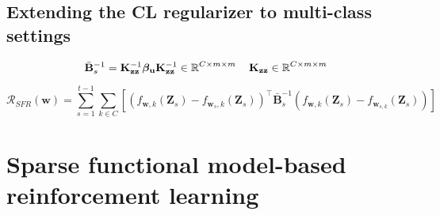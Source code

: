 \documentclass{article}
\newcommand{\mathbold}[1]{\bm{#1}}
\newcommand{\mbf}[1]{\mathbf{#1}}
\newcommand{\MB}{\mbf{B}}
\newcommand{\MZ}{\mbf{Z}}
\newcommand{\T}{\top}
\newcommand{\vbeta}[0]{\mathbold{\beta}}
\newcommand{\vu}{\mbf{u}}
\newcommand{\vw}{\mbf{w}}
\newcommand{\MKzz}{\mbf{K}_{\mbf{z}\mbf{z}}}
\begin{document}
\subsection{Extending the CL regularizer to multi-class settings}
\begin{equation}
	\bar{\MB}^{-1}_s = \MKzz^{-1} \vbeta_\vu \MKzz^{-1} \in \R^{C \times m \times m} \quad \MKzz \in \R^{C \times m \times m} 
\end{equation}

\begin{equation}
	\mathcal{R_\textit{SFR}}(\mathbf{w}) = \sum_{s=1}^{t-1}	\sum_{k \in 	C}\left[\left(f_{\vw, k}(\MZ_{s}) - f_{\vw_{s}, k}(\MZ_s) \right)^\T \bar{\MB}^{-1}_{s} \left(f_{\vw, k}(\MZ_{s}) - f_{\vw_{s, k}}(\MZ_s) \right) \right] 
\end{equation}





\section{Sparse functional model-based reinforcement learning}
\label{app:rl}
\end{document}

